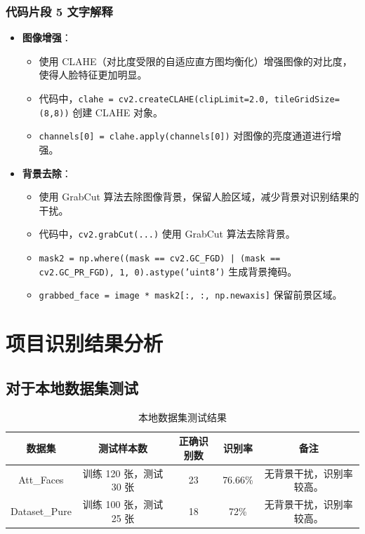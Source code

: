 \documentclass{article}
\begin{document}
\subsubsection{代码片段 5 文字解释}
\begin{itemize}
    \item \textbf{图像增强}：
    \begin{itemize}
        \item 使用 CLAHE（对比度受限的自适应直方图均衡化）增强图像的对比度，使得人脸特征更加明显。
        \item 代码中，\texttt{clahe = cv2.createCLAHE(clipLimit=2.0, tileGridSize=(8,8))} 创建 CLAHE 对象。
        \item \texttt{channels[0] = clahe.apply(channels[0])} 对图像的亮度通道进行增强。
    \end{itemize}
    \item \textbf{背景去除}：
    \begin{itemize}
        \item 使用 GrabCut 算法去除图像背景，保留人脸区域，减少背景对识别结果的干扰。
        \item 代码中，\texttt{cv2.grabCut(...)} 使用 GrabCut 算法去除背景。
        \item \texttt{mask2 = np.where((mask == cv2.GC\_FGD) | (mask == cv2.GC\_PR\_FGD), 1, 0).astype('uint8')} 生成背景掩码。
        \item \texttt{grabbed\_face = image * mask2[:, :, np.newaxis]} 保留前景区域。
    \end{itemize}
\end{itemize}
\newpage
\section{项目识别结果分析}

\subsection{对于本地数据集测试}

\begin{table}[H]
    \centering
    \begin{tabular}{|c|c|c|c|c|}
        \hline
        数据集 & 测试样本数 & 正确识别数 & 识别率 & 备注 \\
        \hline
        Att\_Faces & 训练 120 张，测试 30 张 & 23 & 76.66\% & 无背景干扰，识别率较高。 \\
        \hline
        Dataset\_Pure & 训练 100 张，测试 25 张 & 18 & 72\% & 无背景干扰，识别率较高。 \\
        \hline
    \end{tabular}
    \caption{本地数据集测试结果}
\end{table}
\end{document}

